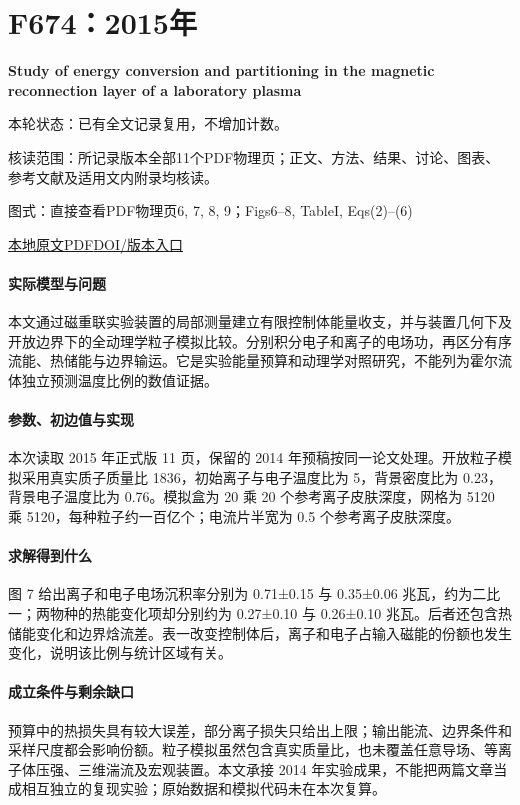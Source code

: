 \section{F674：2015年}\label{paper:F674}

\textbf{Study of energy conversion and partitioning in the magnetic reconnection layer of a laboratory plasma}\citep{F674}

\textsf{本轮状态：}已有全文记录复用，不增加计数。

\textsf{核读范围：}所记录版本全部11个PDF物理页；正文、方法、结果、讨论、图表、参考文献及适用文内附录均核读。\par\textsf{图式：}直接查看PDF物理页6, 7, 8, 9；Figs6–8,  TableI,  Eqs(2)–(6)

\href{run:../../papers/F674_published.pdf}{本地原文PDF}\quad\href{https://doi.org/10.1063/1.4920960}{DOI/版本入口}

\paragraph{实际模型与问题}本文通过磁重联实验装置的局部测量建立有限控制体能量收支，并与装置几何下及开放边界下的全动理学粒子模拟比较。分别积分电子和离子的电场功，再区分有序流能、热储能与边界输运。它是实验能量预算和动理学对照研究，不能列为霍尔流体独立预测温度比例的数值证据。

\paragraph{参数、初边值与实现}本次读取 2015 年正式版 11 页，保留的 2014 年预稿按同一论文处理。开放粒子模拟采用真实质子质量比 1836，初始离子与电子温度比为 5，背景密度比为 0.23，背景电子温度比为 0.76。模拟盒为 20 乘 20 个参考离子皮肤深度，网格为 5120 乘 5120，每种粒子约一百亿个；电流片半宽为 0.5 个参考离子皮肤深度。

\paragraph{求解得到什么}图 7 给出离子和电子电场沉积率分别为 0.71±0.15 与 0.35±0.06 兆瓦，约为二比一；两物种的热能变化项却分别约为 0.27±0.10 与 0.26±0.10 兆瓦。后者还包含热储能变化和边界焓流差。表一改变控制体后，离子和电子占输入磁能的份额也发生变化，说明该比例与统计区域有关。

\paragraph{成立条件与剩余缺口}预算中的热损失具有较大误差，部分离子损失只给出上限；输出能流、边界条件和采样尺度都会影响份额。粒子模拟虽然包含真实质量比，也未覆盖任意导场、等离子体压强、三维湍流及宏观装置。本文承接 2014 年实验成果，不能把两篇文章当成相互独立的复现实验；原始数据和模拟代码未在本次复算。

